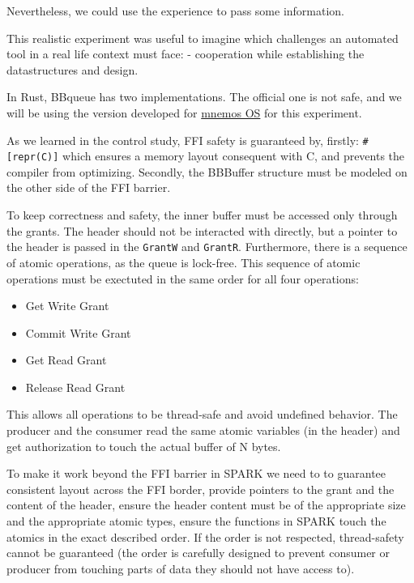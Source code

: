 \documentclass[nomenclature, english, bibtex]{kththesis}
\begin{document}
Nevertheless, we could use the experience to pass some information.

This realistic experiment was useful to imagine which challenges an automated tool in a real life context must face:
- cooperation while establishing the datastructures and design.






In Rust, BBqueue has two implementations. The official one is not  safe, and we will be using the version developed for \href{https://github.com/tosc-rs/mnemos/tree/main/source/abi/src/bbqueue_ipc}{mnemos OS} for this experiment.  

As we learned in the control study,  FFI safety is guaranteed by, firstly:  \texttt{\#[repr(C)]} which ensures a memory layout consequent with C, and prevents the compiler from optimizing. Secondly, the BBBuffer structure must be modeled on the other side of the FFI barrier.

To keep correctness and safety, the inner buffer must be accessed only through the grants. The header should not be interacted with directly, but a pointer to the header is passed in the  \texttt{GrantW} and \texttt{GrantR}. 
Furthermore, there is a sequence of atomic operations, as the queue is lock-free. This sequence of atomic operations must be exectuted in the same order for all four operations:
\begin{itemize}
    \item Get Write Grant
    \item Commit Write Grant
    \item Get Read Grant
    \item Release Read Grant
\end{itemize}
   
This allows all operations to be thread-safe and avoid undefined behavior. The producer and the consumer read the same atomic variables (in the header) and get authorization to touch the actual buffer of N bytes.


To make it work beyond the FFI barrier in SPARK we need to to guarantee consistent layout across the FFI border, provide pointers to the grant and the content of the header, ensure the header content must be of the appropriate size and the appropriate atomic types, ensure the functions in SPARK touch the atomics in the exact described order. If the order is not respected, thread-safety cannot be guaranteed (the order is carefully designed to prevent consumer or producer from touching parts of data they should not have access to).
\end{document}
